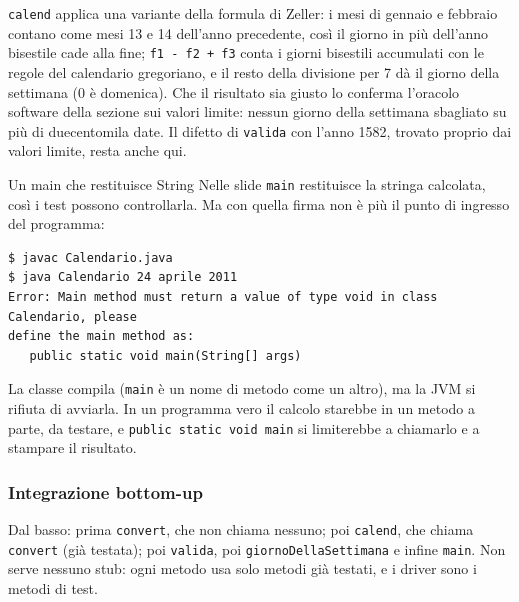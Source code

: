 \texttt{calend} applica una variante della formula di Zeller: i mesi di gennaio e febbraio contano come mesi 13 e 14
dell'anno precedente, così il giorno in più dell'anno bisestile cade alla fine; \texttt{f1 - f2 + f3} conta i giorni
bisestili accumulati con le regole del calendario gregoriano, e il resto della divisione per 7 dà il giorno della
settimana (0 è domenica). Che il risultato sia giusto lo conferma l'oracolo software della sezione sui valori limite:
nessun giorno della settimana sbagliato su più di duecentomila date. Il difetto di \texttt{valida} con l'anno 1582,
trovato proprio dai valori limite, resta anche qui.

\begin{warningbox}{{Un main che restituisce String}}
  Nelle slide \texttt{main} restituisce la stringa calcolata, così i test possono controllarla. Ma con quella firma non
  è più il punto di ingresso del programma:

  \begin{lstlisting}[style=shell, name=Terminale]
$ javac Calendario.java
$ java Calendario 24 aprile 2011
Error: Main method must return a value of type void in class Calendario, please
define the main method as:
   public static void main(String[] args)
\end{lstlisting}

  La classe compila (\texttt{main} è un nome di metodo come un altro), ma la JVM si rifiuta di avviarla. In un programma
  vero il calcolo starebbe in un metodo a parte, da testare, e \texttt{public static void main} si limiterebbe a
  chiamarlo e a stampare il risultato.
\end{warningbox}

\subsubsection*{Integrazione bottom-up}

Dal basso: prima \texttt{convert}, che non chiama nessuno; poi \texttt{calend}, che chiama \texttt{convert} (già
testata); poi \texttt{valida}, poi \texttt{giornoDellaSettimana} e infine \texttt{main}. Non serve nessuno stub: ogni
metodo usa solo metodi già testati, e i driver sono i metodi di test.

